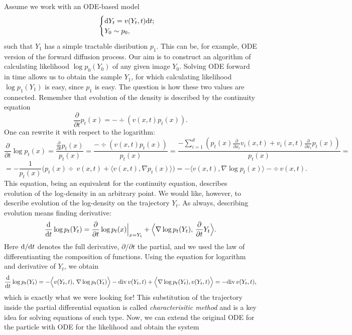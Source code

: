 Assume we work with an ODE-based model
\[
    \begin{cases}
        \mathrm{d} Y_t = v(Y_t, t) \mathrm{d} t;\\
        Y_0 \sim p_0,
    \end{cases}
\]
such that $Y_1$ has a simple tractable disribution $p_1$. This can be, for example, ODE version of the forward diffusion process. Our aim is to construct an algorithm of calculating likelihood $\log p_0(Y_0)$ of any given image $Y_0$. Solving ODE forward in time allows us to obtain the sample $Y_1$, for which calculating likelihood $\log p_1(Y_1)$ is easy, since $p_1$ is easy. The question is how these two values are connected. Remember that evolution of the density is described by the continuity equation
\[
    \frac{\partial}{\partial t} p_t(x) = - \div \left(v(x, t)p_t(x)\right).
\]
One can rewrite it with respect to the logarithm:
\[
    \frac{\partial}{\partial t} \log p_t(x) = \frac{\frac{\partial}{\partial t} p_t(x)}{p_t(x)} = \frac{-\div\left(v(x, t) p_t(x)\right)}{p_t(x)} = \frac{-\sum\limits_{i = 1}^{d} \left(p_t(x)\frac{\partial}{\partial x_i} v_i(x, t) + v_i(x, t) \frac{\partial}{\partial x_i}p_t(x) \right)}{p_t(x)} = 
\]
\[
    = -\frac{1}{p_t(x)} \Big(p_t(x) \div \, v(x, t) + \big\langle v(x, t), \nabla p_t(x) \big\rangle \Big) = -\big\langle v(x, t), \nabla \log p_t(x) \big\rangle - \div \, v(x, t).
\]
This equation, being an equivalent for the continuity equation, describes evolution of the log-density in an arbitrary point. We would like, however, to describe evolution of the log-density on the trajectory $Y_t$. As always, describing evolution means finding derivative:
\[
    \frac{\mathrm{d}}{\mathrm{d} t} \log p_t(Y_t) = \frac{\partial}{\partial t} \log p_t(x) \Big|_{x = Y_t} + \Big\langle \nabla \log p_t(Y_t), \,\frac{\partial}{\partial t} Y_t \Big\rangle.
\]
Here $\mathrm{d} / \mathrm{d} t$ denotes the full derivative, $\partial / \partial t$ the partial, and we used the law of differentianting the composition of functions. Using the equation for logarithm and derivative of $Y_t$, we obtain
\[
    \frac{\mathrm{d}}{\mathrm{d} t} \log p_t(Y_t) = -\Big\langle v(Y_t, t), \,\nabla \log p_t(Y_t) \Big\rangle - \mathrm{div}\, v(Y_t, t) + \Big\langle \nabla \log p_t(Y_t), v(Y_t, t) \Big\rangle = - \mathrm{div} \, v(Y_t, t),
\]
which is exactly what we were looking for! This substitution of the trajectory inside the partial differential equation is called \emph{characterisitic method} and is a key idea for solving equations of such type. Now, we can extend the original ODE for the particle with ODE for the likelihood and obtain the system
